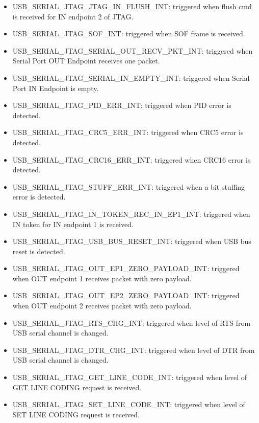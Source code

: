 \documentclass[main\_\_EN.tex]{subfiles}
\begin{document}
\begin{itemize}
    \item \label{int:USBSERIALJTAGJTAGINFLUSHINT}USB\_SERIAL\_JTAG\_JTAG\_IN\_FLUSH\_INT: triggered when flush cmd is received for IN endpoint 2 of JTAG.
    \item \label{int:USBSERIALJTAGSOFINT}USB\_SERIAL\_JTAG\_SOF\_INT: triggered when SOF frame is received. 
    \item \label{int:USBSERIALJTAGSERIALOUTRECVPKTINT}USB\_SERIAL\_JTAG\_SERIAL\_OUT\_RECV\_PKT\_INT: triggered when Serial Port OUT Endpoint receives one packet. 
    \item \label{int:USBSERIALJTAGSERIALINEMPTYINT}USB\_SERIAL\_JTAG\_SERIAL\_IN\_EMPTY\_INT: triggered when Serial Port IN Endpoint is empty. 
    \item \label{int:USBSERIALJTAGPIDERRINT}USB\_SERIAL\_JTAG\_PID\_ERR\_INT: triggered when PID error is detected. 
    \item \label{int:USBSERIALJTAGCRC5ERRINT}USB\_SERIAL\_JTAG\_CRC5\_ERR\_INT: triggered when CRC5 error is detected. 
    \item \label{int:USBSERIALJTAGCRC16ERRINT}USB\_SERIAL\_JTAG\_CRC16\_ERR\_INT: triggered when CRC16 error is detected. 
    \item \label{int:USBSERIALJTAGSTUFFERRINT}USB\_SERIAL\_JTAG\_STUFF\_ERR\_INT: triggered when a bit stuffing error is detected. 
    \item \label{int:USBSERIALJTAGINTOKENRECINEP1INT}USB\_SERIAL\_JTAG\_IN\_TOKEN\_REC\_IN\_EP1\_INT: triggered when IN token for IN endpoint 1 is received.
    \item \label{int:USBSERIALJTAGUSBBUSRESETINT}USB\_SERIAL\_JTAG\_USB\_BUS\_RESET\_INT: triggered when USB bus reset is detected. 
    \item \label{int:USBSERIALJTAGOUTEP1ZEROPAYLOADINT}USB\_SERIAL\_JTAG\_OUT\_EP1\_ZERO\_PAYLOAD\_INT: triggered when OUT endpoint 1 receives packet with zero payload. 
    \item \label{int:USBSERIALJTAGOUTEP2ZEROPAYLOADINT}USB\_SERIAL\_JTAG\_OUT\_EP2\_ZERO\_PAYLOAD\_INT: triggered when OUT endpoint 2 receives packet with zero payload. 
    \item \label{int:USBSERIALJTAGRTSCHGINT}USB\_SERIAL\_JTAG\_RTS\_CHG\_INT: triggered when level of RTS from USB serial channel is changed. 
    \item \label{int:USBSERIALJTAGDTRCHGINT}USB\_SERIAL\_JTAG\_DTR\_CHG\_INT: triggered when level of DTR from USB serial channel is changed. 
    \item \label{int:USBSERIALJTAGGETLINECODEINT}USB\_SERIAL\_JTAG\_GET\_LINE\_CODE\_INT: triggered when level of GET LINE CODING request is received. 
    \item \label{int:USBSERIALJTAGSETLINECODEINT}USB\_SERIAL\_JTAG\_SET\_LINE\_CODE\_INT: triggered when level of SET LINE CODING request is received. 
\end{itemize}
\end{document}
